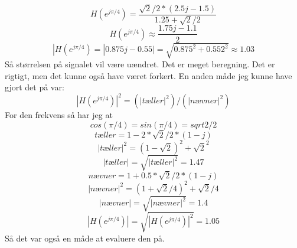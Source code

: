 \begin{EksamensOpgaver}
\begin{Eksamenssæt}[2022 - Forbedringer]
\begin{eksamensOpgave}
\begin{UnderOpgave}
                \[H(e^{j\pi/4}) = \frac{\sqrt{2}/2 * (2.5j - 1.5)}{1.25 + \sqrt{2}/2}\] 
                \[H(e^{j\pi/4}) \approx \frac{1.75j - 1.1}{2}\] 
                \[|H(e^{j\pi/4}) = |0.875j - 0.55| = \sqrt{0.875^2 + 0.552^2} \approx 1.03\]
                Så størrelsen på signalet vil være uændret. 
                Det er meget beregning. Det er rigtigt, men det kunne også have været forkert. 
                En anden måde jeg kunne have gjort det på var: 
                \[|H(e^{j\pi/4})|^2 = (|tæller|^2)/(|nævner|^2)\]
                For den frekvens så har jeg at 
                \[cos(\pi/4) = sin(\pi/4) = sqrt{2}/2\]
                \[tæller = 1 - 2 * \sqrt{2}/2 * (1 - j)\]
                \[|tæller|^2 = (1 - \sqrt{2})^2 + \sqrt{2}^2\]
                \[|tæller| = \sqrt{|tæller|^2} = 1.47\]
                \[nævner = 1 + 0.5 * \sqrt{2}/2 * (1 - j)\]
                \[|nævner|^2 = (1 + \sqrt{2}/4)^2 + \sqrt{2}/4\]
                \[|nævner| = \sqrt{|nævner|^2} = 1.4\]
                \[|H(e^{j\pi/4})| = \sqrt{|H(e^{j\pi/4})|^2} = 1.05\]
                Så det var også en måde at evaluere den på. 
            \end{UnderOpgave}
        \end{eksamensOpgave}
        \begin{eksamensOpgave}
            

\end{eksamensOpgave}
\end{Eksamenssæt}
\end{EksamensOpgaver}

